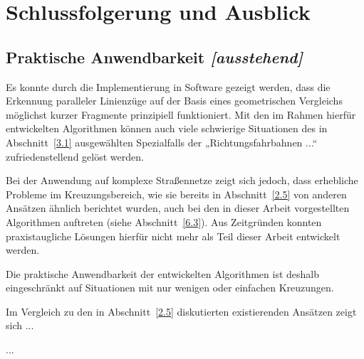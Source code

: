 \documentclass[../main/thesis.tex]{subfiles}
\begin{document}
\chapter{Schlussfolgerung und Ausblick}

\section{Praktische Anwendbarkeit \emph{[ausstehend]}}

Es konnte durch die Implementierung in Software gezeigt werden, dass die Erkennung paralleler Linienzüge auf der Basis eines geometrischen Vergleichs möglichst kurzer Fragmente prinzipiell funktioniert.
Mit den im Rahmen hierfür entwickelten Algorithmen können auch viele schwierige Situationen des in Abschnitt~\ref{3.1} ausgewählten Spezialfalls der „Richtungsfahrbahnen ...“ zufriedenstellend gelöst werden.

Bei der Anwendung auf komplexe Straßennetze zeigt sich jedoch, dass erhebliche Probleme im Kreuzungsbereich, wie sie bereits in Abschnitt~\ref{2.5} von anderen Ansätzen ähnlich berichtet wurden, auch bei den in dieser Arbeit vorgestellten Algorithmen auftreten (siehe Abschnitt~\ref{6.3}).
Aus Zeitgründen konnten praxistaugliche Lösungen hierfür nicht mehr als Teil dieser Arbeit entwickelt werden.

Die praktische Anwendbarkeit der entwickelten Algorithmen ist deshalb eingeschränkt auf Situationen mit nur wenigen oder einfachen Kreuzungen.

Im Vergleich zu den in Abschnitt~\ref{2.5} diskutierten existierenden Ansätzen zeigt sich ...

...
\end{document}

